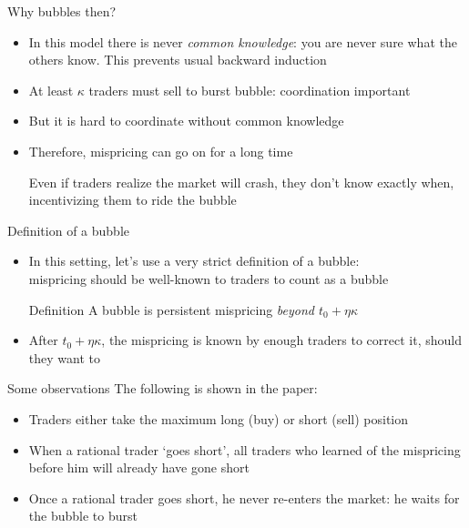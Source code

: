 \documentclass[english,10pt
,aspectratio=169
]{beamer}
\begin{document}
\begin{frame}{Why bubbles then?}
	\begin{itemize}
		\item In this model there is never \emph{common knowledge}: you are never sure what the others know. This prevents usual backward induction
		\item At least $\kappa$ traders must sell to burst bubble: coordination important
		\item But it is hard to coordinate without common knowledge
		\item Therefore, mispricing can go on for a long time
		\begin{block}{}
			Even if traders realize the market will crash, they don't know exactly when, incentivizing them to ride the bubble
		\end{block}
	\end{itemize}
\end{frame}


\begin{frame}{Definition of a bubble}
	\begin{itemize}
		\item In this setting, let's use a very strict definition of a bubble: 
		\\mispricing should be well-known to traders to count as a bubble
		\begin{block}{Definition}
			A bubble is persistent mispricing \emph{beyond $t_0+\eta \kappa$}
		\end{block}
		\item After $t_0+\eta\kappa$, the mispricing is known by enough traders to correct it, should they want to
	\end{itemize}
\end{frame}


\begin{frame}{Some observations}
	The following is shown in the paper:
	\begin{itemize}
		\item Traders either take the maximum long (buy) or short (sell) position
		\item When a rational trader `goes short', all traders who learned of the mispricing before him will already have gone short
		\item Once a rational trader goes short, he never re-enters the market: he waits for the bubble to burst
	\end{itemize}
\end{frame}
\end{document}
